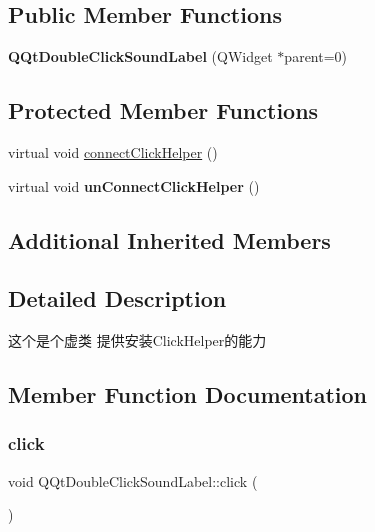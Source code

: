 \subsection*{Public Member Functions}
\begin{DoxyCompactItemize}
\item 
\mbox{\label{class_q_qt_double_click_sound_label_a488c1e7b1fcf26fd5f29898fd4d3b71b}} 
{\bfseries Q\+Qt\+Double\+Click\+Sound\+Label} (Q\+Widget $\ast$parent=0)
\end{DoxyCompactItemize}
\subsection*{Protected Member Functions}
\begin{DoxyCompactItemize}
\item 
virtual void \mbox{\hyperlink{class_q_qt_double_click_sound_label_ad87858f08468acc0bac61228d6f3290c}{connect\+Click\+Helper}} ()
\item 
\mbox{\label{class_q_qt_double_click_sound_label_ad8f97e6de212120f8eab60bc1b16092c}} 
virtual void {\bfseries un\+Connect\+Click\+Helper} ()
\end{DoxyCompactItemize}
\subsection*{Additional Inherited Members}


\subsection{Detailed Description}
这个是个虚类 提供安装\+Click\+Helper的能力 

\subsection{Member Function Documentation}
\mbox{\label{class_q_qt_double_click_sound_label_a82eb8ee41f089b97195070a5a1825510}} 
\subsubsection{\texorpdfstring{click}{click}}
{\footnotesize\ttfamily void Q\+Qt\+Double\+Click\+Sound\+Label\+::click (\begin{DoxyParamCaption}{ }\end{DoxyParamCaption})\hspace{0.3cm}{\ttfamily [signal]}}

